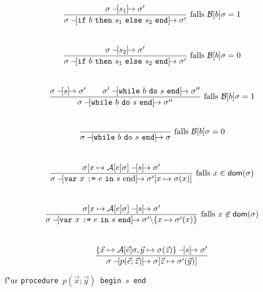 \documentclass[german,10pt, a4paper, twocolumn]{scrartcl}
\newcommand{\natsemarr}[1]{\ensuremath{-\hspace*{-1.52mm}[#1]\hspace*{-1.61mm}\rightarrow}}
\theoremstyle{definition}
\theoremstyle{remark}
\begin{document}
\begin{displaymath}
	\frac{\sigma \natsemarr{s_1}\sigma'}{\sigma \natsemarr{\mbox{\tt if}\ b\ \mbox{\tt then}\ s_1\ \mbox{\tt else}\ s_2\ \mbox{\tt end}}\sigma'} \mbox{ falls } \mathcal{B}[b]\sigma = 1
\end{displaymath}\\

\begin{displaymath}
	\frac{\sigma \natsemarr{s_2}\sigma'}{\sigma \natsemarr{\mbox{\tt if}\ b\ \mbox{\tt then}\ s_1\ \mbox{\tt else}\ s_2\ \mbox{\tt end}}\sigma'} \mbox{ falls } \mathcal{B}[b]\sigma = 0
\end{displaymath}\\

\begin{displaymath}
	\frac{\sigma \natsemarr{s} \sigma' \qquad \sigma' \natsemarr{\mbox{\tt while}\ b\ \mbox{\tt do}\ s\ \mbox{\tt end}}\sigma''}{\sigma\natsemarr{\mbox{\tt while}\ b\ \mbox{\tt do}\ s\ \mbox{\tt end}}\sigma''} \mbox{ falls } \mathcal{B}[b]\sigma = 1
\end{displaymath}\\

\begin{displaymath}
	 \frac{}{\sigma\natsemarr{\mbox{\tt while}\ b\ \mbox{\tt do}\ s\ \mbox{\tt end}}\sigma} \mbox{ falls } \mathcal{B}[b]\sigma = 0
\end{displaymath}\\

\begin{displaymath}
	\frac{\sigma[x\mapsto \mathcal{A}[e]\sigma]\natsemarr{s} \sigma'}{\sigma \natsemarr{\mbox{\tt var}\ x\ \mbox{\tt :=}\ e\ \mbox{\tt in}\ s\ \mbox{end}}\sigma'[x\mapsto\sigma(x)]} \mbox{ falls } x \in \textsf{dom}(\sigma)
\end{displaymath}\\

\begin{displaymath}
	\frac{\sigma[x\mapsto \mathcal{A}[e]\sigma]\natsemarr{s} \sigma'}{\sigma \natsemarr{\mbox{\tt var}\ x\ \mbox{\tt :=}\ e\ \mbox{\tt in}\ s\ \mbox{\tt end}}\sigma' \backslash \{ x\mapsto\sigma'(x)\} } \mbox{ falls } x \not\in \textsf{dom}(\sigma)
\end{displaymath}\\

\begin{displaymath}
	\frac{\{\vec{x}\mapsto \mathcal{A}[\vec{e}]\sigma, \vec{y} \mapsto \sigma(\vec{z})\} \natsemarr{s} \sigma'}{ \sigma \natsemarr{p(\vec{e};\vec{z})} \sigma [\vec{z}\mapsto \sigma'(\vec{y})]}
\end{displaymath}
\begin{center}
	f"ur \tt{procedure} $p(\vec{x};\vec{y})$ \tt{begin} $s$ \tt{end}
\end{center}
\end{document}
